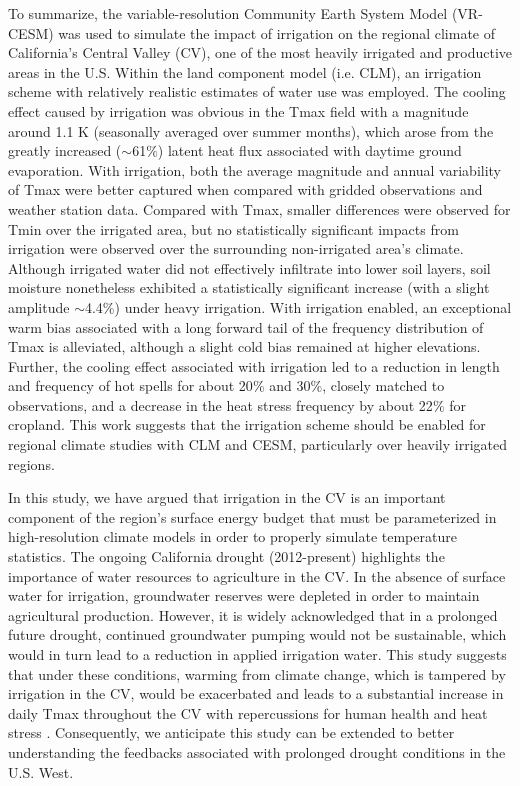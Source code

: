 \documentclass[draft,ms]{agutex}   %
\begin{document}
\begin{article}
To summarize, the variable-resolution Community Earth System Model (VR-CESM) was used to simulate the impact of irrigation on the regional climate of California's Central Valley (CV), one of the most heavily irrigated and productive areas in the U.S. Within the land component model (i.e. CLM), an irrigation scheme with relatively realistic estimates of water use was employed. The cooling effect caused by irrigation was obvious in the Tmax field with a magnitude around 1.1 K (seasonally averaged over summer months), which arose from the greatly increased ($\sim$61$\%$) latent heat flux associated with daytime ground evaporation. With irrigation, both the average magnitude and annual variability of Tmax were better captured when compared with gridded observations and weather station data. Compared with Tmax, smaller differences were observed for Tmin over the irrigated area, but no statistically significant impacts from irrigation were observed over the surrounding non-irrigated area's climate. Although irrigated water did not effectively infiltrate into lower soil layers, soil moisture nonetheless exhibited a statistically significant increase (with a slight amplitude $\sim$4.4$\%$) under heavy irrigation. With irrigation enabled, an exceptional warm bias associated with a long forward tail of the frequency distribution of Tmax is alleviated, although a slight cold bias remained at higher elevations. Further, the cooling effect associated with irrigation led to a reduction in length and frequency of hot spells for about 20$\%$ and 30$\%$, closely matched to observations, and a decrease in the heat stress frequency by about 22$\%$ for cropland. This work suggests that the irrigation scheme should be enabled for regional climate studies with CLM and CESM, particularly over heavily irrigated regions.

In this study, we have argued that irrigation in the CV is an important component of the region's surface energy budget that must be parameterized in high-resolution climate models in order to properly simulate temperature statistics. The ongoing California drought (2012-present) highlights the importance of water resources to agriculture in the CV. In the absence of surface water for irrigation, groundwater reserves were depleted in order to maintain agricultural production.  However, it is widely acknowledged that in a prolonged future drought, continued groundwater pumping would not be sustainable, which would in turn lead to a reduction in applied irrigation water.  This study suggests that under these conditions, warming from climate change, which is tampered by irrigation in the CV, would be exacerbated and leads to a substantial increase in daily Tmax throughout the CV with repercussions for human health and heat stress \citep{williams2015contribution}. Consequently, we anticipate this study can be extended to better understanding the feedbacks associated with prolonged drought conditions in the U.S. West.


\end{article}
\end{document}
